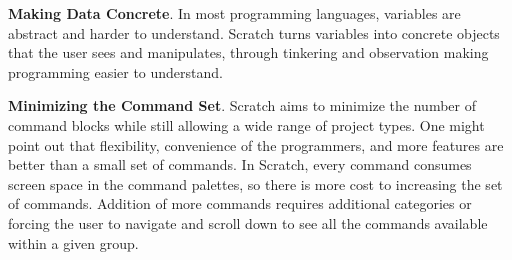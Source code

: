 \parx
\textbf{Making Data Concrete}.
In most programming languages, variables are abstract and harder to understand.
Scratch turns variables into concrete objects that the user sees and
manipulates, through tinkering and observation making programming easier to
understand.

\parx
\textbf{Minimizing the Command Set}.
Scratch aims to minimize the number of command blocks while still allowing a
wide range of project types. One might point out that flexibility, convenience
of the programmers, and more features are better than a small set of commands.
In Scratch, every command consumes screen space in the command palettes, so
there is more cost to increasing the set of commands. Addition of more commands
requires additional categories or forcing the user to navigate and scroll down
to see all the commands available within a given group.
